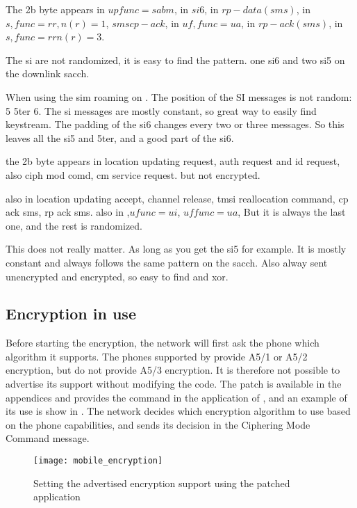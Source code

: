       The 2b byte appears in $up func=sabm$, in $si6$, in
      $rp-data(sms)$, in $s, func=rr, n(r)=1$, $sms cp-ack$, in $uf,
      func=ua$, in $rp-ack(sms)$, in $s, func=rr n(r)=3$. 

      The si are not randomized, it is easy to find the pattern. one
      si6 and two si5 on the downlink sacch.

      When using the  \gls{sim} roaming on .
      The position of the SI messages is not random: 5 5ter 6. The si
      messages are mostly constant, so great way to easily find
      keystream. The padding of the si6 changes every two or three
      messages. So this leaves all the si5 and 5ter, and a good part
      of the si6.

      the 2b byte appears in location updating request, auth request
      and id request, also ciph mod comd, cm service request. but not
      encrypted.

      also in location updating accept, channel release, tmsi
      reallocation command, cp ack sms, rp ack sms. 
      also in ,$u func=ui$, $uf func=ua$,  But it is
      always the last one, and the rest is randomized. 

      This does not really matter. As long as you get the si5 for
      example. It is mostly constant and always follows the same
      pattern on the sacch. Also alway sent unencrypted and encrypted,
      so easy to find and xor.
      \fi

    \subsection{Encryption in use}

      Before starting the encryption, the network will first ask the
      phone which algorithm it supports. The phones supported by
       provide A5/1 or A5/2 encryption, but do not
      provide A5/3 encryption. It is therefore not possible to advertise
      its support without modifying the code. The patch is available in
      the appendices  and provides the
       command in the  application of
      , and an example of its use is show in
      . The network decides which encryption
      algorithm to use based on the phone capabilities, and sends its
      decision in the Ciphering Mode Command message.

      \begin{figure}[p]
        \centering
        \texttt{[image: mobile\_encryption]}
        \caption{Setting the advertised encryption support using the patched
         application}
        \label{fig:mobile_encryption}
      \end{figure}
      

